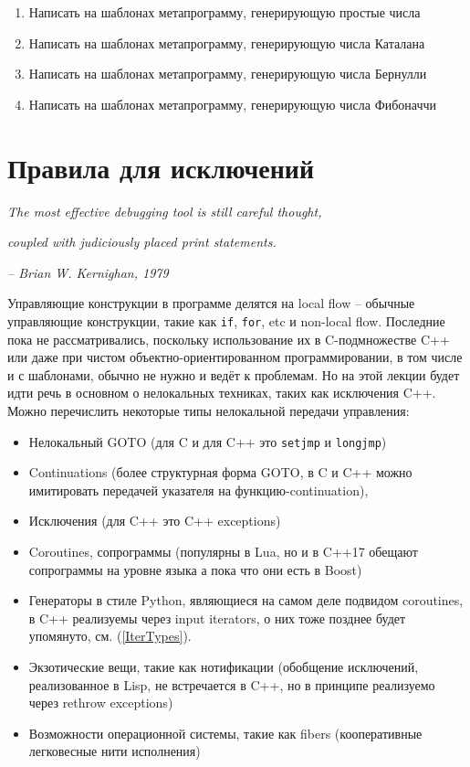 \documentclass[a4paper,12pt,oneside]{article}
\begin{document}
\begin{enumerate}
\item
Написать на шаблонах метапрограмму, генерирующую простые числа

\item
Написать на шаблонах метапрограмму, генерирующую числа Каталана

\item
Написать на шаблонах метапрограмму, генерирующую числа Бернулли 

\item
Написать на шаблонах метапрограмму, генерирующую числа Фибоначчи

\end{enumerate}

\pagebreak
\section{Правила для исключений}

\hfill\textit{The most effective debugging tool is still careful thought,}

\hfill\textit{coupled with judiciously placed print statements.}{\vspace{0.5em}}

\hfill\textit{-- Brian W. Kernighan, 1979}

Управляющие конструкции в программе делятся на local flow -- обычные управляющие конструкции, такие как \lstinline!if!, \lstinline!for!, etc и non-local flow. Последние пока не рассматривались, поскольку использование их в C-подмножестве C++ или даже при чистом объектно-ориентированном программировании, в том числе и с шаблонами, обычно не нужно и ведёт к проблемам. Но на этой лекции будет идти речь в основном о нелокальных техниках, таких как исключения C++. Можно перечислить некоторые типы нелокальной передачи управления:

\begin{itemize}
\item
Нелокальный GOTO (для C и для C++ это \lstinline!setjmp! и \lstinline!longjmp!)
\item
Continuations (более структурная форма GOTO, в C и C++ можно имитировать передачей указателя на функцию-continuation), 
\item
Исключения (для C++ это C++ exceptions)
\item
Coroutines, сопрограммы (популярны в Lua, но и в C++17 обещают сопрограммы на уровне языка а пока что они есть в Boost)
\item
Генераторы в стиле Python, являющиеся на самом деле подвидом coroutines, в C++ реализуемы через input iterators, о них тоже позднее будет упомянуто, см. (\ref{IterTypes}).
\item
Экзотические вещи, такие как нотификации (обобщение исключений, реализованное в Lisp, не встречается в C++, но в принципе реализуемо через rethrow exceptions)
\item
Возможности операционной системы, такие как fibers (кооперативные легковесные нити исполнения)
\end{itemize}
\end{document}
